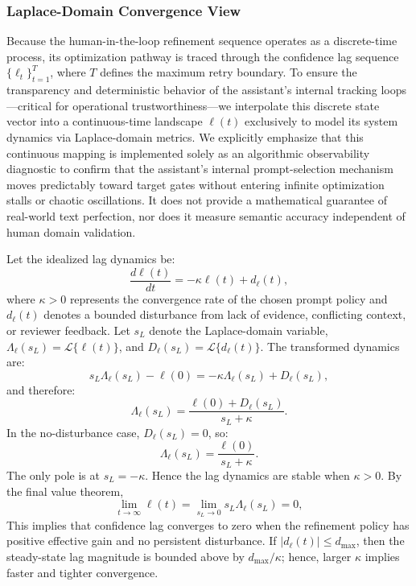 \subsubsection{Laplace-Domain Convergence View}
Because the human-in-the-loop refinement sequence operates as a discrete-time process, its optimization pathway is traced through the confidence lag sequence $\{\ell_t\}_{t=1}^T$, where $T$ defines the maximum retry boundary. To ensure the transparency and deterministic behavior of the assistant's internal tracking loops—critical for operational trustworthiness—we interpolate this discrete state vector into a continuous-time landscape $\ell(t)$ exclusively to model its system dynamics via Laplace-domain metrics. We explicitly emphasize that this continuous mapping is implemented solely as an algorithmic observability diagnostic to confirm that the assistant's internal prompt-selection mechanism moves predictably toward target gates without entering infinite optimization stalls or chaotic oscillations. It does not provide a mathematical guarantee of real-world text perfection, nor does it measure semantic accuracy independent of human domain validation.


Let the idealized lag dynamics be:
\begin{equation}
\frac{d\ell(t)}{dt} = -\kappa \ell(t) + d_{\ell}(t),
\end{equation}
where \(\kappa>0\) represents the convergence rate of the chosen prompt policy and \(d_{\ell}(t)\) denotes a bounded disturbance from lack of evidence, conflicting context, or reviewer feedback. Let $s_L$ denote the Laplace-domain variable, $\Lambda_{\ell}(s_L)=\mathcal{L}\{\ell(t)\}$, and $D_{\ell}(s_L)=\mathcal{L}\{d_{\ell}(t)\}$. The transformed dynamics are:
\begin{equation}
s_L\Lambda_{\ell}(s_L)-\ell(0)=-\kappa\Lambda_{\ell}(s_L)+D_{\ell}(s_L),
\end{equation}
and therefore:
\begin{equation}
\Lambda_{\ell}(s_L)=\frac{\ell(0)+D_{\ell}(s_L)}{s_L+\kappa}.
\end{equation}
In the no-disturbance case, \(D_{\ell}(s_L)=0\), so:
\begin{equation}
\Lambda_{\ell}(s_L)=\frac{\ell(0)}{s_L+\kappa}.
\end{equation}
The only pole is at \(s_L=-\kappa\). Hence the lag dynamics are stable when \(\kappa>0\). By the final value theorem,
\begin{equation}
\lim_{t\to\infty}\ell(t)=\lim_{s_L\to 0}s_L\Lambda_{\ell}(s_L)=0,
\end{equation}
This implies that confidence lag converges to zero when the refinement policy has positive effective gain and no persistent disturbance. If $|d_{\ell}(t)|\le d_{\max}$, then the steady-state lag magnitude is bounded above by $d_{\max}/\kappa$; hence, larger \(\kappa\) implies faster and tighter convergence.

